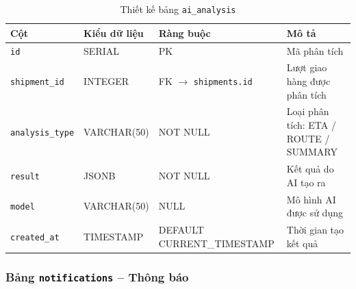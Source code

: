 \begin{table}[H]
\centering
\caption{Thiết kế bảng \texttt{ai\_analysis}}
\begin{tabularx}{\textwidth}{|l|l|Z|Z|}
\hline
\textbf{Cột} &
\textbf{Kiểu dữ liệu} &
\textbf{Ràng buộc} &
\textbf{Mô tả} \\ \hline

\texttt{id}
& SERIAL
& PK
& Mã phân tích \\ \hline

\texttt{shipment\_id}
& INTEGER
& FK $\rightarrow$ \texttt{shipments.id}
& Lượt giao hàng được phân tích \\ \hline

\texttt{analysis\_type}
& VARCHAR(50)
& NOT NULL
& Loại phân tích: ETA / ROUTE / SUMMARY \\ \hline

\texttt{result}
& JSONB
& NOT NULL
& Kết quả do AI tạo ra \\ \hline

\texttt{model}
& VARCHAR(50)
& NULL
& Mô hình AI được sử dụng \\ \hline

\texttt{created\_at}
& TIMESTAMP
& DEFAULT CURRENT\_TIMESTAMP
& Thời gian tạo kết quả \\ \hline

\end{tabularx}
\end{table}


\fi


\subsubsection{Bảng \texttt{notifications} -- Thông báo}

